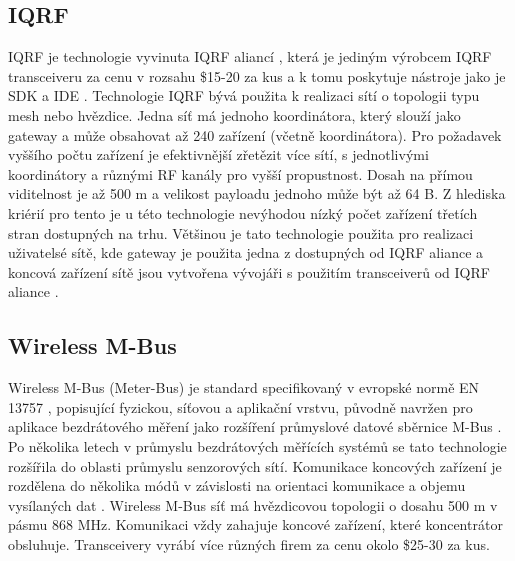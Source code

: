 \subsection{IQRF}
IQRF je technologie vyvinuta IQRF aliancí \cite{iqrf_alliance}, která je jediným výrobcem IQRF transceiveru \cite{iqrf_transceivers} za cenu v rozsahu \$15-20 za kus a k tomu poskytuje nástroje jako je SDK \DIFaddbegin {}\DIFaddend \cite{iqrf_sdk} a IDE \DIFaddbegin {}\DIFaddend \cite{iqrf_ide}.
Technologie IQRF bývá použita k realizaci sítí o topologii typu mesh nebo hvězdice.
Jedna síť má jednoho koordinátora, který slouží jako gateway a může obsahovat až 240 zařízení (včetně koordinátora). Pro požadavek vyššího počtu zařízení je efektivnější zřetězit více sítí, s jednotlivými koordinátory a různými RF kanály pro vyšší propustnost.
Dosah na přímou viditelnost je až 500 m a velikost payloadu jednoho \DIFdelbegin {}\DIFdelend \DIFaddbegin {}\DIFaddend může být až 64 B.
Z hlediska kriérií pro tento \DIFdelbegin {}\DIFdelend \DIFaddbegin {}\DIFaddend je u této technologie nevýhodou nízký počet zařízení třetích stran dostupných na trhu. 
Většinou je tato technologie použita pro realizaci uživatelsé sítě, kde gateway je použita jedna z dostupných od IQRF aliance a koncová zařízení sítě jsou vytvořena vývojáři s použitím transceiverů od IQRF aliance
\cite{paper_iqrf}.


\subsection{Wireless M-Bus}
Wireless M-Bus (Meter-Bus) je standard specifikovaný v evropské normě EN 13757 \DIFaddbegin {}\DIFaddend , popisující fyzickou, síťovou a aplikační vrstvu, původně navržen pro aplikace bezdrátového měření jako rozšíření průmyslové datové sběrnice M-Bus \cite{wirelessMBus_automatizace}.
Po několika letech v průmyslu bezdrátových měřících systémů se tato technologie rozšířila do oblasti průmyslu senzorových sítí.
Komunikace koncových zařízení je rozdělena do několika módů v závislosti na orientaci komunikace a objemu vysílaných dat \cite{wirelessMBus01}\DIFaddbegin \DIFadd{, }\DIFaddend \cite{wirelessMBus02}. 
Wireless M-Bus síť má hvězdicovou topologii o dosahu 500 m v pásmu 868 MHz.
Komunikaci vždy zahajuje koncové zařízení, které koncentrátor obsluhuje.
Transceivery vyrábí více různých firem za cenu okolo \$25-30 za kus.


